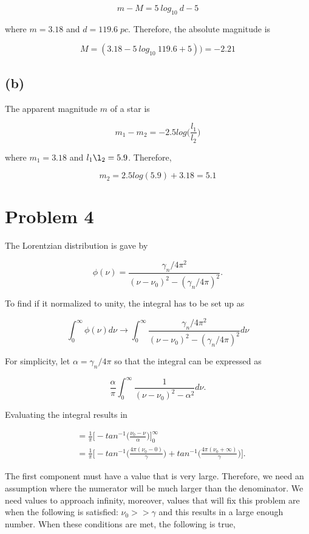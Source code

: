 \documentclass[11pt]{article}
\begin{document}
$$
m - M = 5 \ log_{10} \ d - 5
$$

where $m = 3.18$ and $d = 119.6 \; pc$. Therefore, the absolute magnitude is

$$
M = (3.18 - 5 \ log_{10} \ 119.6 + 5)) = - 2.21
$$

\subsection*{(b)}

The apparent magnitude $m$ of a star is

$$
m_{1} - m_{2} = -2.5log\Bigg(\frac{l_{1}}{l_{2}}\Bigg)
$$

where $m_{1} = 3.18$ and $l_{1}\l_{2} = 5.9$. Therefore,

$$
m_{2} = 2.5log(5.9) + 3.18 = 5.1
$$

\clearpage

\section*{Problem 4}

The Lorentzian distribution is gave by

$$
\phi(\nu) = \frac{\gamma_{n}/4\pi^{2}}{(\nu - \nu_{0})^{2}-(\gamma_{n}/4\pi)^{2}}.
$$

To find if it normalized to unity, the integral has to be set up as

$$
\int_{0}^{\infty} \phi(\nu) d\nu \rightarrow \int_{0}^{\infty}  \frac{\gamma_{n}/4\pi^{2}}{(\nu - \nu_{0})^{2}-(\gamma_{n}/4\pi)^{2}} d\nu 
$$

For simplicity, let $\alpha = \gamma_{n}/4\pi$ so that the integral can be expressed as

$$
\frac{\alpha}{\pi} \int_{0}^{\infty}  \frac{1}{(\nu - \nu_{0})^{2}-\alpha^{2}} d\nu.
$$

Evaluating the integral results in

\begin{align*}
&=\frac{1}{\pi} \Bigg[-tan^{-1}\Big(\frac{\nu_{0} - \nu}{\alpha}\Big) \Bigg]_{0}^{\infty} \\
&= \frac{1}{\pi} \Bigg[-tan^{-1}\Big(\frac{4\pi(\nu_{0} - 0)}{\gamma}\Big) + tan^{-1}\Big(\frac{4\pi(\nu_{0} + \infty)}{\gamma}\Big)  \Bigg].
\end{align*}

The first component must have a value that is very large. Therefore, we need an assumption where the numerator will be much larger than the denominator. We need values to approach infinity, moreover, values that will fix this problem are when the following is satisfied: $\nu_{0} >> \gamma$ and this results in a large enough number. When these conditions are met, the following is true,
\end{document}
